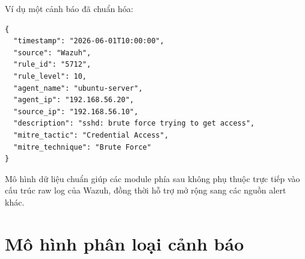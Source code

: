 \documentclass[a4paper,12pt,oneside]{book}
\begin{document}
{\noindent Ví dụ một cảnh báo đã chuẩn hóa:

\begin{verbatim}
{
  "timestamp": "2026-06-01T10:00:00",
  "source": "Wazuh",
  "rule_id": "5712",
  "rule_level": 10,
  "agent_name": "ubuntu-server",
  "agent_ip": "192.168.56.20",
  "source_ip": "192.168.56.10",
  "description": "sshd: brute force trying to get access",
  "mitre_tactic": "Credential Access",
  "mitre_technique": "Brute Force"
}
\end{verbatim}

\noindent Mô hình dữ liệu chuẩn giúp các module phía sau không phụ thuộc trực tiếp vào cấu trúc raw log của Wazuh, đồng thời hỗ trợ mở rộng sang các nguồn alert khác.

}

\section{Mô hình phân loại cảnh báo}
\end{document}
